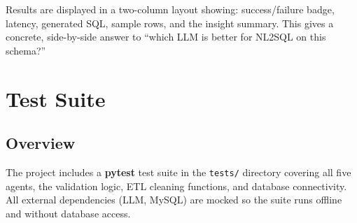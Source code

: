 \documentclass[12pt,a4paper]{report}
\begin{document}
Results are displayed in a two-column layout showing: success/failure badge, latency,
generated SQL, sample rows, and the insight summary. This gives a concrete, side-by-side
answer to ``which LLM is better for NL2SQL on this schema?''

\chapter{Test Suite}
\label{ch:testing}

\section{Overview}

The project includes a \textbf{pytest} test suite in the \texttt{tests/} directory covering all
five agents, the validation logic, ETL cleaning functions, and database connectivity. All external
dependencies (LLM, MySQL) are mocked so the suite runs offline and without database access.
\end{document}
